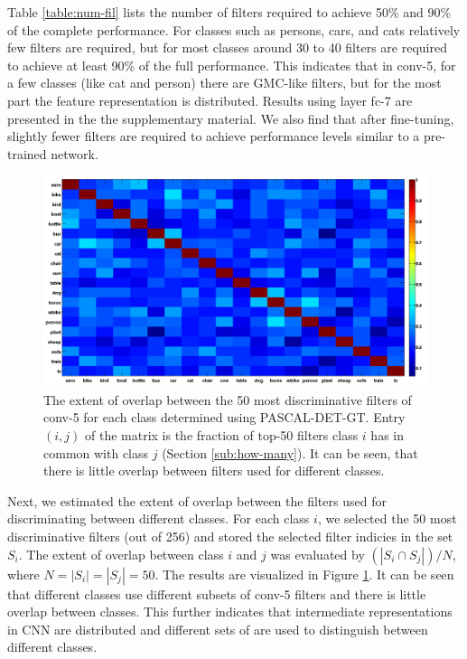 Table \ref{table:num-fil} lists the number of filters required to achieve 50\% and 90\% of the complete performance. For classes such as persons, cars, and cats relatively few filters are required, but for most classes around 30 to 40 filters are required to achieve at least 90\% of the full performance. This indicates that in conv-5, for a few classes (like cat and person) there are GMC-like filters, but for the most part the feature representation is distributed.
Results using layer fc-7 are presented in the the supplementary material.
We also find that after fine-tuning, slightly fewer filters are required to achieve performance levels similar to a pre-trained network. 

\begin{figure}[t!]
\centering
\includegraphics[width=1.0\linewidth]{images/ftNet_commonfilters.png}
\caption{The extent of overlap between the 50 most discriminative filters of conv-5 for each class determined using PASCAL-DET-GT.
Entry $(i, j)$ of the matrix is the fraction of top-50 filters class $i$ has in common with class $j$ (Section \ref{sub:how-many}). It can be seen, that there is little overlap between filters used for different classes.}
\label{fig:overlap}
\end{figure}

Next, we estimated the extent of overlap between the filters used for discriminating between different classes.
For each class $i$, we selected the 50 most discriminative filters (out of 256) and stored the selected filter indicies in the set $S_i$.
The extent of overlap between class $i$ and $j$ was evaluated by $(|S_i \cap S_j|) / N$,
where $N = |S_i| = |S_j| = 50$. The results are visualized in Figure \ref{fig:overlap}. It can be seen that different classes use different subsets of conv-5 filters and there is little overlap between classes. This further indicates that intermediate representations in CNN are distributed and different sets of are used to distinguish between different classes. 

